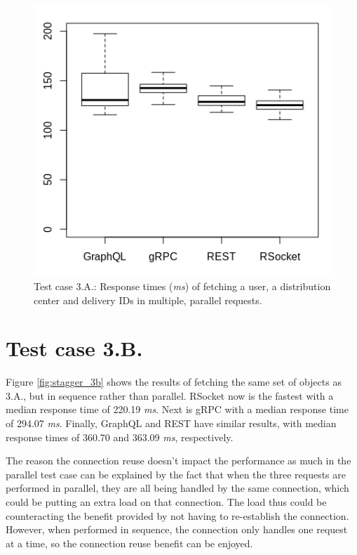 \begin{figure}[ht!]
    \centerline{\includegraphics[scale=0.7]{thesis_svava/images/stagger3anew.png}}
    \caption{Test case 3.A.: Response times (\textit{ms}) of fetching a user, a distribution center and delivery IDs in multiple, parallel requests.}
    \label{fig:stagger_3a}
\end{figure}

\section{Test case 3.B.} \label{sec:stagger_3b}
Figure \ref{fig:stagger_3b} shows the results of fetching the same set of objects as 3.A., but in sequence rather than parallel. RSocket now is the fastest with a median response time of 220.19 \textit{ms}. Next is gRPC with a median response time of 294.07 \textit{ms}. Finally, GraphQL and REST have similar results, with median response times of 360.70 and 363.09 \textit{ms}, respectively.

The reason the connection reuse doesn't impact the performance as much in the parallel test case can be explained by the fact that when the three requests are performed in parallel, they are all being handled by the same connection, which could be putting an extra load on that connection. The load thus could be counteracting the benefit provided by not having to re-establish the connection. However, when performed in sequence, the connection only handles one request at a time, so the connection reuse benefit can be enjoyed.

